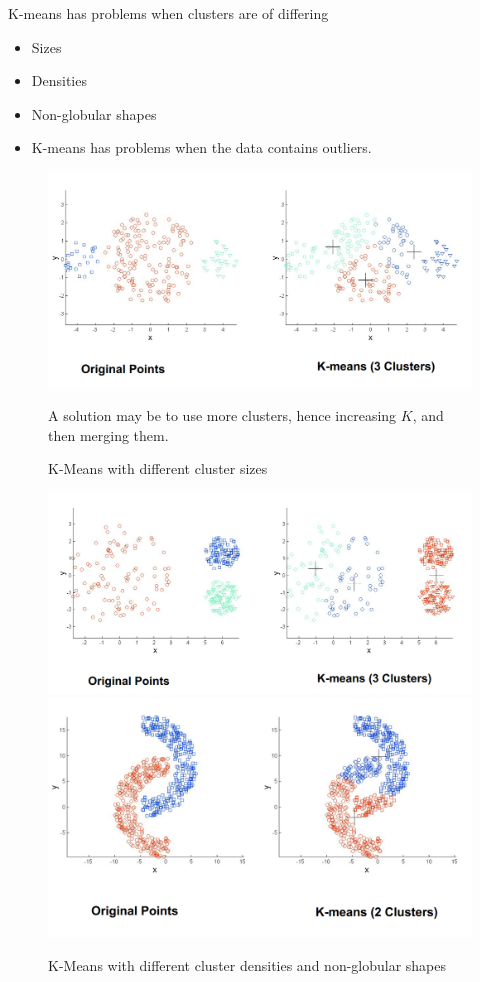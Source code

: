 \begin{paracol}{2}
	\colfill
	K-means has problems when clusters are of differing
	\begin{itemize}
		\item Sizes
		\item Densities
		\item Non-globular shapes
		\item K-means has problems when the data contains outliers.
	\end{itemize}
	\colfill
	\switchcolumn
	\begin{figure}[htbp]
		\centering
		\includegraphics[width=0.9\columnwidth]{images/04/kproblems.png}
		\caption{K-Means with different cluster sizes}
		A solution may be to use more clusters, hence increasing $K$, and then merging them.
		\label{fig:04/kproblems}
	\end{figure}

\end{paracol}

\begin{figure}[htbp]
	\centering
	\includegraphics[width=0.48\columnwidth]{images/04/kdensity.png}
	\includegraphics[width=0.48\columnwidth]{images/04/kglobular.png}
	\caption{K-Means with different cluster densities and non-globular shapes}
	\label{fig:04/kdensity}
\end{figure}
